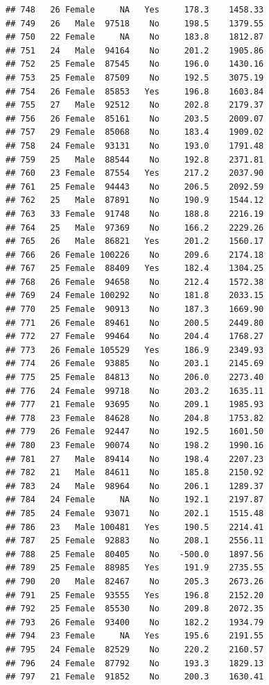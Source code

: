 \documentclass[12pt,]{krantz}
\theoremstyle{definition}
\theoremstyle{definition}
\theoremstyle{remark}
\begin{document}
\begin{verbatim}
## 748   26 Female     NA   Yes     178.3    1458.33
## 749   26   Male  97518    No     198.5    1379.55
## 750   22 Female     NA    No     183.8    1812.87
## 751   24   Male  94164    No     201.2    1905.86
## 752   25 Female  87545    No     196.0    1430.16
## 753   25 Female  87509    No     192.5    3075.19
## 754   26 Female  85853   Yes     196.8    1603.84
## 755   27   Male  92512    No     202.8    2179.37
## 756   26 Female  85161    No     203.5    2009.07
## 757   29 Female  85068    No     183.4    1909.02
## 758   24 Female  93131    No     193.0    1791.48
## 759   25   Male  88544    No     192.8    2371.81
## 760   23 Female  87554   Yes     217.2    2037.90
## 761   25 Female  94443    No     206.5    2092.59
## 762   25   Male  87891    No     190.9    1544.12
## 763   33 Female  91748    No     188.8    2216.19
## 764   25   Male  97369    No     166.2    2229.26
## 765   26   Male  86821   Yes     201.2    1560.17
## 766   26 Female 100226    No     209.6    2174.18
## 767   25 Female  88409   Yes     182.4    1304.25
## 768   26 Female  94658    No     212.4    1572.38
## 769   24 Female 100292    No     181.8    2033.15
## 770   25 Female  90913    No     187.3    1669.90
## 771   26 Female  89461    No     200.5    2449.80
## 772   27 Female  99464    No     204.4    1768.27
## 773   26 Female 105529   Yes     186.9    2349.93
## 774   26 Female  93885    No     203.1    2145.69
## 775   25 Female  84813    No     206.0    2273.40
## 776   24 Female  99718    No     203.2    1635.11
## 777   21 Female  93695    No     209.1    1985.93
## 778   23 Female  84628    No     204.8    1753.82
## 779   26 Female  92447    No     192.5    1601.50
## 780   23 Female  90074    No     198.2    1990.16
## 781   27   Male  89414    No     198.4    2207.23
## 782   21   Male  84611    No     185.8    2150.92
## 783   24   Male  98964    No     206.1    1289.37
## 784   24 Female     NA    No     192.1    2197.87
## 785   24 Female  93071    No     202.1    1515.48
## 786   23   Male 100481   Yes     190.5    2214.41
## 787   25 Female  92883    No     208.1    2556.11
## 788   25 Female  80405    No    -500.0    1897.56
## 789   25 Female  88985   Yes     191.9    2735.55
## 790   20   Male  82467    No     205.3    2673.26
## 791   25 Female  93555   Yes     196.8    2152.20
## 792   25 Female  85530    No     209.8    2072.35
## 793   26 Female  93400    No     182.2    1934.79
## 794   23 Female     NA   Yes     195.6    2191.55
## 795   24 Female  82529    No     220.2    2160.57
## 796   24 Female  87792    No     193.3    1829.13
## 797   21 Female  91852    No     200.3    1630.41

\end{verbatim}
\end{document}
